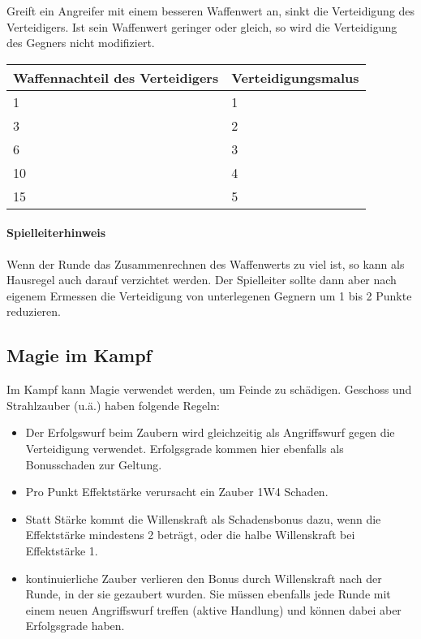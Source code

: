 \documentclass{article}
\begin{document}
Greift ein Angreifer mit einem besseren Waffenwert an, sinkt die Verteidigung des Verteidigers. Ist sein Waffenwert
geringer oder gleich, so wird die Verteidigung des Gegners nicht modifiziert.


\begin{small}
\begin{tabular}{|m{3cm}|m{3cm}|}
\hline
\textbf{Waffennachteil des Verteidigers}&\textbf{Verteidigungsmalus}\\
\hline
\hline
1&1\\
\hline
3&2\\
\hline
6&3\\
\hline
10&4\\
\hline
15&5\\
\hline
\end{tabular}
\end{small}

\begin{mdframed}[hidealllines=true, backgroundcolor=black!10]
\paragraph{Spielleiterhinweis}

Wenn der Runde das Zusammenrechnen des Waffenwerts zu viel ist, so kann als Hausregel auch darauf verzichtet werden.
Der Spielleiter sollte dann aber nach eigenem Ermessen die Verteidigung von unterlegenen Gegnern um 1 bis 2 Punkte
reduzieren.

\end{mdframed}
\begin{center}
\subsection{Magie im Kampf}
\end{center}

Im Kampf kann Magie verwendet werden, um Feinde zu schädigen. Geschoss und Strahlzauber (u.ä.) haben folgende Regeln:

\begin{itemize}
\item Der Erfolgswurf beim Zaubern wird gleichzeitig als Angriffswurf gegen die Verteidigung verwendet. Erfolgsgrade kommen hier ebenfalls als Bonusschaden zur Geltung.
\item Pro Punkt Effektstärke verursacht ein Zauber 1W4 Schaden.
\item Statt Stärke kommt die Willenskraft als Schadensbonus dazu, wenn die Effektstärke mindestens 2 beträgt, oder die halbe Willenskraft bei Effektstärke 1.
\item kontinuierliche Zauber verlieren den Bonus durch Willenskraft nach der Runde, in der sie gezaubert wurden. Sie müssen ebenfalls jede Runde mit einem neuen Angriffswurf treffen (aktive Handlung) und können dabei aber Erfolgsgrade haben.
\end{itemize}
\end{document}
